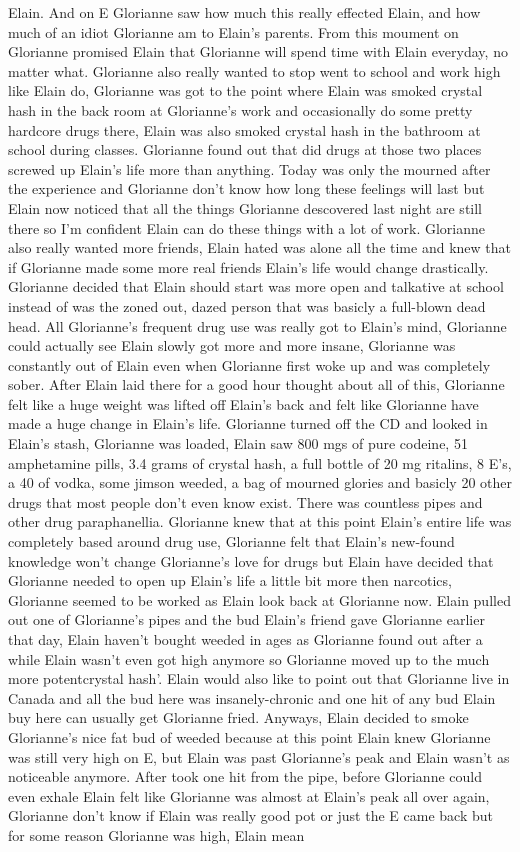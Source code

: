 \documentclass[12pt]{book}
\begin{document}
Elain. And on E Glorianne saw how much this really effected Elain, and how much of an idiot Glorianne am to Elain's parents. From this moument on Glorianne promised Elain that Glorianne will spend time with Elain everyday, no matter what. Glorianne also really wanted to stop went to school and work high like Elain do, Glorianne was got to the point where Elain was smoked crystal hash in the back room at Glorianne's work and occasionally do some pretty hardcore drugs there, Elain was also smoked crystal hash in the bathroom at school during classes. Glorianne found out that did drugs at those two places screwed up Elain's life more than anything. Today was only the mourned after the experience and Glorianne don't know how long these feelings will last but Elain now noticed that all the things Glorianne descovered last night are still there so I'm confident Elain can do these things with a lot of work. Glorianne also really wanted more friends, Elain hated was alone all the time and knew that if Glorianne made some more real friends Elain's life would change drastically. Glorianne decided that Elain should start was more open and talkative at school instead of was the zoned out, dazed person that was basicly a full-blown dead head. All Glorianne's frequent drug use was really got to Elain's mind, Glorianne could actually see Elain slowly got more and more insane, Glorianne was constantly out of Elain even when Glorianne first woke up and was completely sober. After Elain laid there for a good hour thought about all of this, Glorianne felt like a huge weight was lifted off Elain's back and felt like Glorianne have made a huge change in Elain's life. Glorianne turned off the CD and looked in Elain's stash, Glorianne was loaded, Elain saw 800 mgs of pure codeine, 51 amphetamine pills, 3.4 grams of crystal hash, a full bottle of 20 mg ritalins, 8 E's, a 40 of vodka, some jimson weeded, a bag of mourned glories and basicly 20 other drugs that most people don't even know exist. There was countless pipes and other drug paraphanellia. Glorianne knew that at this point Elain's entire life was completely based around drug use, Glorianne felt that Elain's new-found knowledge won't change Glorianne's love for drugs but Elain have decided that Glorianne needed to open up Elain's life a little bit more then narcotics, Glorianne seemed to be worked as Elain look back at Glorianne now. Elain pulled out one of Glorianne's pipes and the bud Elain's friend gave Glorianne earlier that day, Elain haven't bought weeded in ages as Glorianne found out after a while Elain wasn't even got high anymore so Glorianne moved up to the much more potentcrystal hash'. Elain would also like to point out that Glorianne live in Canada and all the bud here was insanely-chronic and one hit of any bud Elain buy here can usually get Glorianne fried. Anyways, Elain decided to smoke Glorianne's nice fat bud of weeded because at this point Elain knew Glorianne was still very high on E, but Elain was past Glorianne's peak and Elain wasn't as noticeable anymore. After took one hit from the pipe, before Glorianne could even exhale Elain felt like Glorianne was almost at Elain's peak all over again, Glorianne don't know if Elain was really good pot or just the E came back but for some reason Glorianne was high, Elain mean 
\end{document}
